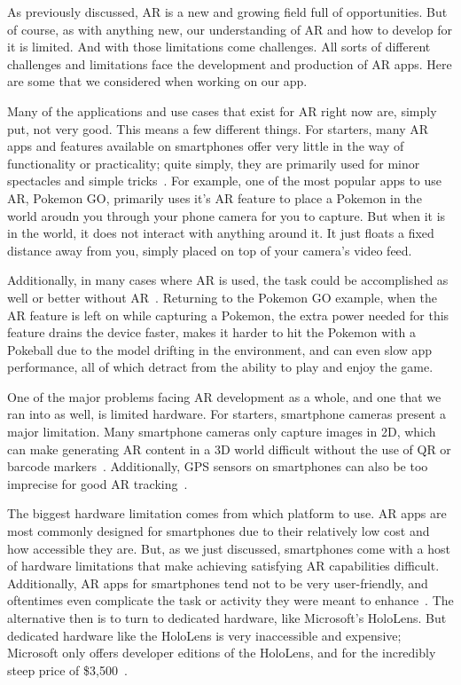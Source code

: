 \documentclass[a4paper, 10pt, american, titlepage]{article}
\begin{document}
As previously discussed, AR is a new and growing field full of opportunities.
But of course, as with anything new, our understanding of AR and how to develop
for it is limited.  And with those limitations come challenges. All sorts of
different challenges and limitations face the development and production of AR
apps. Here are some that we considered when working on our app.

Many of the applications and use cases that exist for AR right now are, simply
put, not very good. This means a few different things. For starters, many AR
apps and features available on smartphones offer very little in the way of
functionality or practicality; quite simply, they are primarily used for minor
spectacles and simple tricks~\autocite{theappsolutions2018}. For example, one
of the most popular apps to use AR, Pokemon GO, primarily uses it's AR feature
to place a Pokemon in the world aroudn you through your phone camera for you to
capture. But when it is in the world, it does not interact with anything around
it. It just floats a fixed distance away from you, simply placed on top of your
camera's video feed. 

Additionally, in many cases where AR is used, the task could be accomplished as
well or better without AR~\autocite{theappsolutions2018}. Returning to the
Pokemon GO example, when the AR feature is left on while capturing a Pokemon,
the extra power needed for this feature drains the device faster, makes it
harder to hit the Pokemon with a Pokeball due to the model drifting in the
environment, and can even slow app performance, all of which detract from the
ability to play and enjoy the game. 

One of the major problems facing AR development as a whole, and one that we ran
into as well, is limited hardware. For starters, smartphone cameras present a
major limitation. Many smartphone cameras only capture images in 2D, which can
make generating AR content in a 3D world difficult without the use of QR or
barcode markers~\autocite{geospatialworld2018}. Additionally, GPS sensors on
smartphones can also be too imprecise for good AR
tracking~\autocite{geospatialworld2018}.

The biggest hardware limitation comes from which platform to use. AR apps are
most commonly designed for smartphones due to their relatively low cost and how
accessible they are. But, as we just discussed, smartphones come with a host of
hardware limitations that make achieving satisfying AR capabilities difficult.
Additionally, AR apps for smartphones tend not to be very user-friendly, and
oftentimes even complicate the task or activity they were meant to
enhance~\autocite{theappsolutions2018}.  The alternative then is to turn to
dedicated hardware, like Microsoft's HoloLens.  But dedicated hardware like the
HoloLens is very inaccessible and expensive; Microsoft only offers developer
editions of the HoloLens, and for the incredibly steep price of
\$3,500~\autocite{microsoft2019}. 
\end{document}
